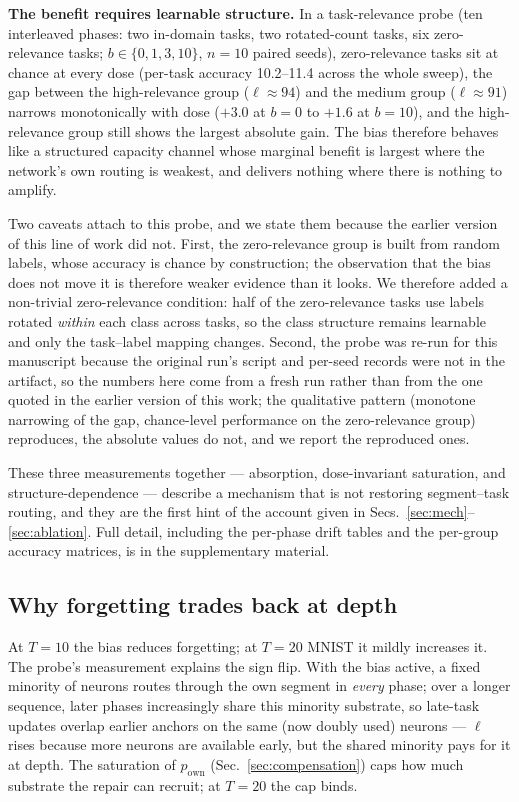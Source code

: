 \documentclass[review,12pt,number]{elsarticle}
\newcommand{\own}{p_{\mathrm{own}}}
\begin{document}
\textbf{The benefit requires learnable structure.} In a task-relevance
probe (ten interleaved phases: two in-domain tasks, two rotated-count
tasks, six zero-relevance tasks; $b\in\{0,1,3,10\}$, $n=10$ paired seeds),
zero-relevance tasks sit at chance at every dose (per-task accuracy
10.2--11.4 across the whole
sweep), the gap between the high-relevance group
($\ell\approx94$) and the medium group
($\ell\approx91$) narrows monotonically with
dose ($+3.0$ at $b{=}0$ to $+1.6$ at
$b{=}10$), and the high-relevance group still shows the largest absolute
gain. The bias therefore behaves like a structured capacity channel whose
marginal benefit is largest where the network's own routing is weakest, and
delivers nothing where there is nothing to amplify.

Two caveats attach to this probe, and we state them because the earlier
version of this line of work did not. First, the zero-relevance group is
built from random labels, whose accuracy is chance by construction; the
observation that the bias does not move it is therefore weaker evidence
than it looks. We therefore added a non-trivial zero-relevance condition:
half of the zero-relevance tasks use labels rotated \emph{within} each
class across tasks, so the class structure remains learnable and only the
task--label mapping changes. Second, the probe was re-run for this
manuscript because the original run's script and per-seed records were not
in the artifact, so the numbers here come from a fresh run rather than from
the one quoted in the earlier version of this work; the qualitative
pattern (monotone narrowing of the gap, chance-level performance on the
zero-relevance group) reproduces, the absolute values do not, and we report
the reproduced ones.

These three measurements together --- absorption, dose-invariant
saturation, and structure-dependence --- describe a mechanism that is not
restoring segment--task routing, and they are the first hint of the
account given in Secs.~\ref{sec:mech}--\ref{sec:ablation}. Full detail,
including the per-phase drift tables and the per-group accuracy matrices,
is in the supplementary material.

\subsection{Why forgetting trades back at depth}
\label{sec:depthbwt}

At $T{=}10$ the bias reduces forgetting; at $T{=}20$ MNIST it mildly
increases it. The probe's measurement explains the sign flip. With the
bias active, a fixed minority of neurons routes through the own segment in
\emph{every} phase; over a longer sequence, later phases increasingly
share this minority substrate, so late-task updates overlap earlier
anchors on the same (now doubly used) neurons --- $\ell$ rises because
more neurons are available early, but the shared minority pays for it at
depth. The saturation of $\own$ (Sec.~\ref{sec:compensation}) caps how
much substrate the repair can recruit; at $T{=}20$ the cap binds.
\end{document}
